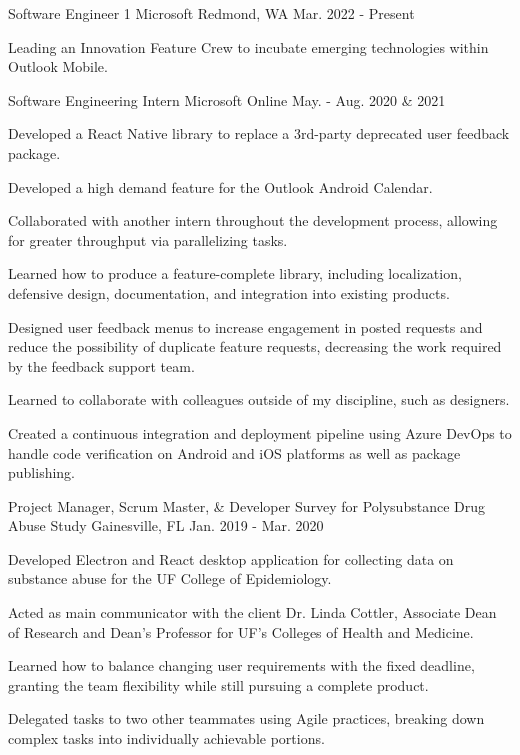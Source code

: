 \begin{cventries}
  \cventry
    {Software Engineer 1}
    {Microsoft}
    {Redmond, WA}
    {Mar. 2022 - Present}
    {
      \begin{cvitems}
        \item{Leading an Innovation Feature Crew to incubate emerging technologies within Outlook Mobile.}
      \end{cvitems}
    }
  \cventry
    {Software Engineering Intern}
    {Microsoft}
    {Online}
    {May. - Aug. 2020 \& 2021}
    {
      \begin{cvitems}
        \item{Developed a React Native library to replace a 3rd-party deprecated user feedback package.}
        \item{Developed a high demand feature for the Outlook Android Calendar.}
        \item{Collaborated with another intern throughout the development process, allowing for greater throughput via parallelizing tasks.}
        \item{Learned how to produce a feature-complete library, including localization, defensive design, documentation, and integration into existing products.}
        \item{Designed user feedback menus to increase engagement in posted requests and reduce the possibility of duplicate feature requests, decreasing the work required by the feedback support team.}
        \item{Learned to collaborate with colleagues outside of my discipline, such as designers.}
        \item{Created a continuous integration and deployment pipeline using Azure DevOps to handle code verification on Android and iOS platforms as well as package publishing.}
      \end{cvitems}
    }
  \cventry
    {Project Manager, Scrum Master, \& Developer}
    {Survey for Polysubstance Drug Abuse Study}
    {Gainesville, FL}
    {Jan. 2019 - Mar. 2020}
    {
      \begin{cvitems}
        \item {Developed Electron and React desktop application for collecting data on substance abuse for the UF College of Epidemiology.}
        \item {Acted as main communicator with the client Dr. Linda Cottler, Associate Dean of Research and Dean's Professor for UF's Colleges of Health and Medicine.}
        \item {Learned how to balance changing user requirements with the fixed deadline, granting the team flexibility while still pursuing a complete product.}
        \item {Delegated tasks to two other teammates using Agile practices, breaking down complex tasks into individually achievable portions.}
      \end{cvitems}
    }
\end{cventries}
